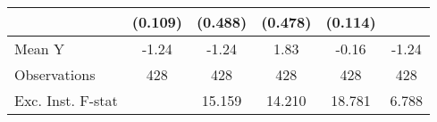 {\begin{tabular}{l*{5}{c}}
            &     (0.109)         &     (0.488)         &     (0.478)         &     (0.114)         &                     \\
\midrule
Mean Y      &       -1.24         &       -1.24         &        1.83         &       -0.16         &       -1.24         \\
Observations&         428         &         428         &         428         &         428         &         428         \\
Exc. Inst. F-stat&                     &      15.159         &      14.210         &      18.781         &       6.788         \\
\bottomrule
\end{tabular}
}
